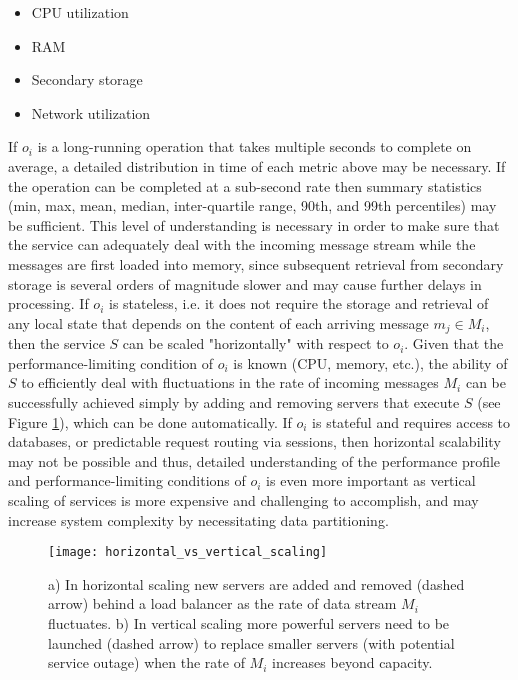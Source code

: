 \begin{itemize}
    \item CPU utilization
    \item RAM
    \item Secondary storage
    \item Network utilization
\end{itemize}

If $o_i$ is a long-running operation that takes multiple seconds to complete on average, a detailed distribution in time of each metric above may be necessary. If the operation can be completed at a sub-second rate then summary statistics (min, max, mean, median, inter-quartile range, 90th, and 99th percentiles) may be sufficient. This level of understanding is necessary in order to make sure that the service can adequately deal with the incoming message stream while the messages are first loaded into memory, since subsequent retrieval from secondary storage is several orders of magnitude slower and may cause further delays in processing. If $o_i$ is stateless, i.e. it does not require the storage and retrieval of any local state that depends on the content of each arriving message $m_j \in M_i$, then the service $S$ can be scaled "horizontally"\autocite{vaquero2011dynamically} with respect to $o_i$. Given that the performance-limiting condition of $o_i$ is known (CPU, memory, etc.), the ability of $S$ to efficiently deal with fluctuations in the rate of incoming messages $M_i$ can be successfully achieved simply by adding and removing servers that execute $S$ (see Figure \ref{fig:horizontal_vs_vertical_scaling}), which can be done automatically\autocite{mao2011auto}. If $o_i$ is stateful and requires access to databases, or predictable request routing via sessions, then horizontal scalability may not be possible and thus, detailed understanding of the performance profile and performance-limiting conditions of $o_i$ is even more important as vertical scaling of services is more expensive and challenging to accomplish, and may increase system complexity by necessitating data partitioning\autocite{vaquero2011dynamically}.

\begin{figure}[H]
\texttt{[image: horizontal\_vs\_vertical\_scaling]}
\centering
\caption {a) In horizontal scaling new servers are added and removed (dashed arrow) behind a load balancer as the rate of data stream $M_i$ fluctuates. b) In vertical scaling more powerful servers need to be launched (dashed arrow) to replace smaller servers (with potential service outage) when the rate of $M_i$ increases beyond capacity.}
\label{fig:horizontal_vs_vertical_scaling}
\end{figure}

